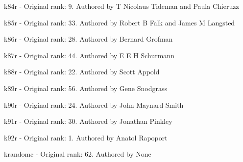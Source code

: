 \item k84r - Original rank: 9. Authored by T Nicolaus Tideman and Paula Chieruzz
\item k85r - Original rank: 33. Authored by Robert B Falk and James M Langsted
\item k86r - Original rank: 28. Authored by Bernard Grofman
\item k87r - Original rank: 44. Authored by E E H Schurmann
\item k88r - Original rank: 22. Authored by Scott Appold
\item k89r - Original rank: 56. Authored by Gene Snodgrass
\item k90r - Original rank: 24. Authored by John Maynard Smith
\item k91r - Original rank: 30. Authored by Jonathan Pinkley
\item k92r - Original rank: 1. Authored by Anatol Rapoport
\item krandomc - Original rank: 62. Authored by None
